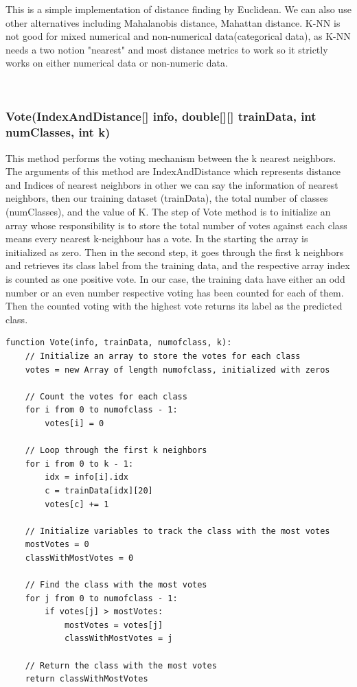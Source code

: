 \documentclass[conference]{IEEEtran}
\begin{document}
This is a simple implementation of distance finding by Euclidean. We can also use other alternatives including Mahalanobis distance, Mahattan distance. K-NN is not good for mixed numerical and non-numerical data(categorical data), as K-NN needs a two notion "nearest" and most distance metrics to work so it strictly works on either numerical data or non-numeric data.  


\


\subsubsection{Vote(IndexAndDistance[] info, double[][] trainData, int numClasses, int k)}
This method performs the voting mechanism between the k nearest neighbors. The arguments of this method are IndexAndDistance which represents distance and Indices of nearest neighbors in other we can say the information of nearest neighbors, then our training dataset (trainData), the total number of classes (numClasses), and the value of K. The step of Vote method is to initialize an array whose responsibility is to store the total number of votes against each class means every nearest k-neighbour has a vote. In the starting the array is initialized as zero. Then in the second step, it goes through the first k neighbors and retrieves its class label from the training data, and the respective array index is counted as one positive vote. In our case, the training data have either an odd number or an even number respective voting has been counted for each of them. Then the counted voting with the highest vote returns its label as the predicted class. 

\begin{lstlisting}
function Vote(info, trainData, numofclass, k):
    // Initialize an array to store the votes for each class
    votes = new Array of length numofclass, initialized with zeros
    
    // Count the votes for each class
    for i from 0 to numofclass - 1:
        votes[i] = 0
    
    // Loop through the first k neighbors
    for i from 0 to k - 1:
        idx = info[i].idx
        c = trainData[idx][20]
        votes[c] += 1
    
    // Initialize variables to track the class with the most votes
    mostVotes = 0
    classWithMostVotes = 0
    
    // Find the class with the most votes
    for j from 0 to numofclass - 1:
        if votes[j] > mostVotes:
            mostVotes = votes[j]
            classWithMostVotes = j
    
    // Return the class with the most votes
    return classWithMostVotes


\end{lstlisting}
\end{document}

